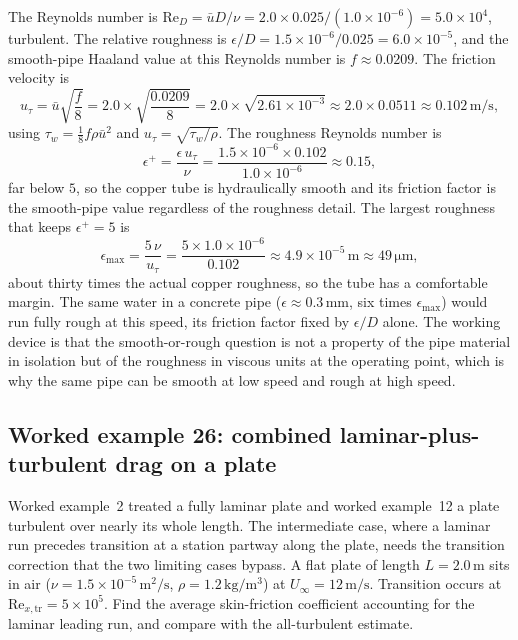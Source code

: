 The Reynolds number is $\text{Re}_D = \bar u D/\nu = 2.0\times0.025/
(1.0\times10^{-6}) = 5.0\times10^{4}$, turbulent. The relative
roughness is $\epsilon/D = 1.5\times10^{-6}/0.025 = 6.0\times10^{-5}$,
and the smooth-pipe Haaland value at this Reynolds number is $f\approx
0.0209$. The friction velocity is
\[
u_\tau = \bar u\sqrt{\frac{f}{8}} = 2.0\times\sqrt{\frac{0.0209}{8}}
= 2.0\times\sqrt{2.61\times10^{-3}} \approx 2.0\times0.0511 \approx
0.102\,\si{\meter\per\second},
\]
using $\tau_w = \tfrac18 f\rho\bar u^2$ and $u_\tau = \sqrt{\tau_w/
\rho}$. The roughness Reynolds number is
\[
\epsilon^+ = \frac{\epsilon\,u_\tau}{\nu} = \frac{1.5\times10^{-6}
\times0.102}{1.0\times10^{-6}} \approx 0.15,
\]
far below $5$, so the copper tube is hydraulically smooth and its
friction factor is the smooth-pipe value regardless of the roughness
detail. The largest roughness that keeps $\epsilon^+ = 5$ is
\[
\epsilon_{\max} = \frac{5\,\nu}{u_\tau} = \frac{5\times1.0\times
10^{-6}}{0.102} \approx 4.9\times10^{-5}\,\si{\meter} \approx 49\,\si{
\micro\meter},
\]
about thirty times the actual copper roughness, so the tube has a
comfortable margin. The same water in a concrete pipe ($\epsilon\approx
0.3\,\si{\milli\meter}$, six times $\epsilon_{\max}$) would run fully
rough at this speed, its friction factor fixed by $\epsilon/D$ alone.
The working device is that the smooth-or-rough question is not a
property of the pipe material in isolation but of the roughness in
viscous units at the operating point, which is why the same pipe can be
smooth at low speed and rough at high speed.

\subsection*{Worked example 26: combined laminar-plus-turbulent drag on a plate}

Worked example~2 treated a fully laminar plate and worked example~12 a
plate turbulent over nearly its whole length. The intermediate case,
where a laminar run precedes transition at a station partway along the
plate, needs the transition correction that the two limiting cases
bypass. A flat plate of length $L = 2.0\,\si{\meter}$ sits in air
($\nu = 1.5\times10^{-5}\,\si{\meter}^2/\si{\second}$, $\rho = 1.2\,\si{
\kilogram\per\meter\cubed}$) at $U_\infty = 12\,\si{\meter\per\second}$.
Transition occurs at $\text{Re}_{x,\text{tr}} = 5\times10^{5}$. Find the
average skin-friction coefficient accounting for the laminar leading
run, and compare with the all-turbulent estimate.

